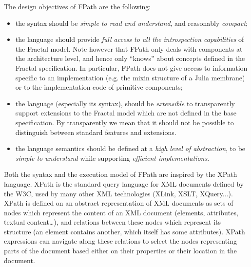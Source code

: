 \documentclass[a4paper,12pt]{report}
\begin{document}
The design objectives of FPath are the following:
\begin{itemize}
\item the syntax should be \emph{simple to read and understand}, and reasonably
  \emph{compact};
\item the language should provide \emph{full access to all the introspection capabilities}
  of the Fractal model. Note however that FPath only deals with components at the
  architecture level, and hence only ``knows'' about concepts defined in the Fractal
  specification. In particular, FPath does not give access to information specific to an
  implementation (e.g. the mixin structure of a Julia membrane) or to the implementation
  code of primitive components;
\item the language (especially its syntax), should be \emph{extensible} to transparently
  support extensions to the Fractal model which are not defined in the base specification.
  By transparently we mean that it should not be possible to distinguish between standard
  features and extensions.
\item the language semantics should be defined at a \emph{high level of abstraction}, to
  be \emph{simple to understand} while supporting \emph{efficient implementations}.
\end{itemize}

Both the syntax and the execution model of FPath are inspired by the XPath
\cite{xpath.w3c1999} language. XPath is the standard query language for XML documents
defined by the W3C, used by many other XML technologies (XLink, XSLT, XQuery...). XPath is
defined on an abstract representation of XML documents as sets of nodes which represent
the content of an XML document (elements, attributes, textual content\dots), and relations
between these nodes which represent its structure (an element contains another, which
itself has some attributes). XPath expressions can navigate along these relations to
select the nodes representing parts of the document based either on their properties or
their location in the document.
\end{document}
